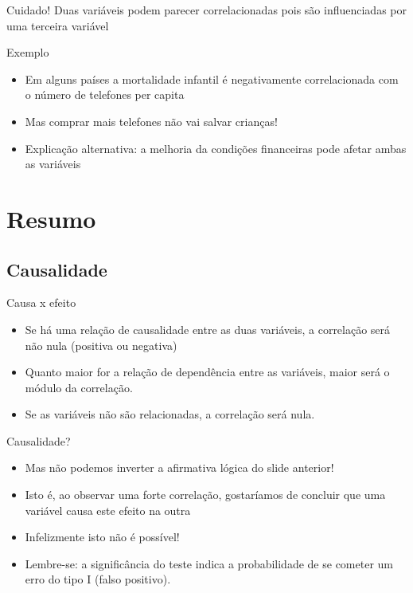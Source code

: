 \documentclass{beamer}
\begin{document}
\begin{frame}{}
  \begin{block}{Cuidado!}
    Duas variáveis podem \alert{parecer} correlacionadas pois são
    influenciadas por uma terceira variável
  \end{block}
  \begin{exampleblock}{Exemplo}
    \begin{itemize}
      \footnotesize
    \item Em alguns países a mortalidade infantil é negativamente
      correlacionada com o número de telefones per capita
    \item Mas comprar mais telefones não vai salvar crianças!
      \bigskip
    \item Explicação alternativa: a melhoria da condições financeiras
      pode afetar ambas as variáveis
    \end{itemize}    
  \end{exampleblock}
\end{frame}

\section{Resumo}

\subsection{Causalidade}

\begin{frame}{Causa x efeito}
  \begin{itemize}
  \item Se há uma relação de causalidade entre as duas variáveis, a
    correlação será não nula (positiva ou negativa)
  \item Quanto maior for a relação de dependência entre as variáveis,
    maior será o módulo da correlação.
  \item Se as variáveis não são relacionadas, a correlação será nula.
  \end{itemize}
\end{frame}

\begin{frame}{Causalidade?}
  \begin{itemize}
  \item Mas não podemos inverter a afirmativa lógica do slide
    anterior!
  \item Isto é, ao observar uma forte correlação, gostaríamos de
    concluir que uma variável \alert{causa} este efeito na outra
  \item Infelizmente isto não é possível!
  \item Lembre-se: a significância do teste indica a probabilidade de
    se cometer um erro do tipo I (falso positivo).
  \end{itemize}
\end{frame}
\end{document}
